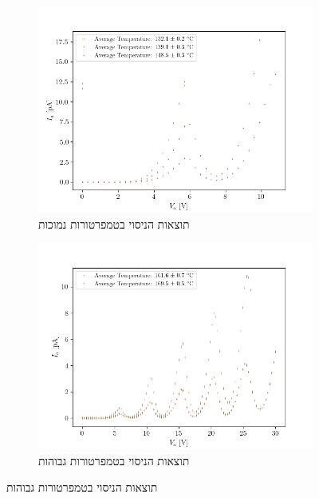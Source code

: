 \documentclass{article}
\begin{document}
\begin{figure}[H]
    \begin{subfigure}[b]{\textwidth}
    	\centering
    	\includegraphics[width=\textwidth]{changingTemp_0-10V.png}
    	\caption{תוצאות הניסוי בטמפרטורות נמוכות}
    	\label{fig:Changing_temp_0-10v}
    \end{subfigure}
    \hfill
    \begin{subfigure}[b]{\textwidth}
    	\centering
    	\includegraphics[width=\textwidth]{changingTemp_0-30V.png}
    	\caption{תוצאות הניסוי בטמפרטורות גבוהות}
    	\label{fig:Changing_temp_0-30v}
    \end{subfigure}
\end{figure}


\end{document}

